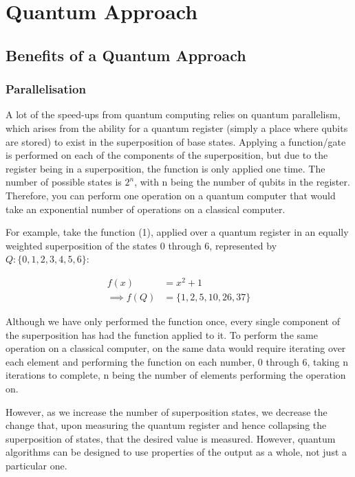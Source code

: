 {}
\section*{Quantum Approach}

{}
\subsection*{Benefits of a Quantum Approach}

{}
\subsubsection*{Parallelisation}
A lot of the speed-ups from quantum computing relies on quantum parallelism, which arises from the ability for a quantum register (simply a place where qubits are stored) to exist in the superposition of base states. Applying a function/gate is performed on each of the components of the superposition, but due to the register being in a superposition, the function is only applied one time. The number of possible states is $2^{n}$, with n being the number of qubits in the register. Therefore, you can perform one operation on a quantum computer that would take an exponential number of operations on a classical computer.

For example, take the function (1), applied over a quantum register in an equally weighted superposition of the states 0 through 6, represented by $Q: \{0, 1, 2, 3, 4, 5, 6\}$:

\begin{align}
	f(x)          & = x^{2}+1                 \\
	\implies f(Q) & = \{1, 2, 5, 10, 26, 37\}
\end{align}

Although we have only performed the function once, every single component of the superposition has had the function applied to it. To perform the same operation on a classical computer, on the same data would require iterating over each element and performing the function on each number, 0 through 6, taking n iterations to complete, n being the number of elements performing the operation on.

However, as we increase the number of superposition states, we decrease the change that, upon measuring the quantum register and hence collapsing the superposition of states, that the desired value is measured. However, quantum algorithms can be designed to use properties of the output as a whole, not just a particular one.

